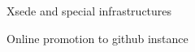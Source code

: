 
\begin{frame}
	Xsede and special infrastructures	
\end{frame}

\begin{frame}
		Online promotion to github instance
\end{frame}
